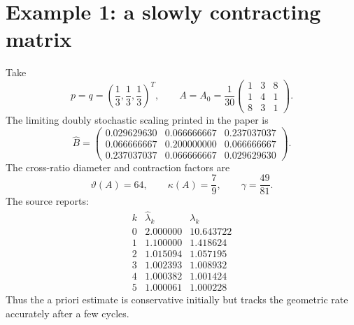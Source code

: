 \section*{Example 1: a slowly contracting matrix}
Take
\[
  p=q=\left(\frac13,\frac13,\frac13\right)^T,
  \qquad
  A=A_0=\frac1{30}
  \begin{pmatrix}
    1&3&8\\
    1&4&1\\
    8&3&1
  \end{pmatrix}.
\]
The limiting doubly stochastic scaling printed in the paper is
\[
  \widehat B=
  \begin{pmatrix}
    0.029629630&0.066666667&0.237037037\\
    0.066666667&0.200000000&0.066666667\\
    0.237037037&0.066666667&0.029629630
  \end{pmatrix}.
\]
The cross-ratio diameter and contraction factors are
\[
  \vartheta(A)=64,
  \qquad
  \kappa(A)=\frac79,
  \qquad
  \gamma=\frac{49}{81}.
\]
The source reports:
\[
\begin{array}{c|cc}
 k&\widehat\lambda_k&\lambda_k\\\hline
 0&2.000000&10.643722\\
 1&1.100000&1.418624\\
 2&1.015094&1.057195\\
 3&1.002393&1.008932\\
 4&1.000382&1.001424\\
 5&1.000061&1.000228
\end{array}
\]
Thus the a priori estimate is conservative initially but tracks the geometric
rate accurately after a few cycles.

